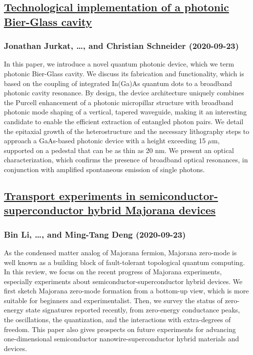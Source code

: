 \subsection*{\href{http://arxiv.org/abs/2009.10986v1}{Technological implementation of a photonic Bier-Glass cavity}}
\subsubsection*{Jonathan Jurkat, \dots, and Christian Schneider (2020-09-23)}
In this paper, we introduce a novel quantum photonic device, which we term
photonic Bier-Glass cavity. We discuss its fabrication and functionality, which
is based on the coupling of integrated In(Ga)As quantum dots to a broadband
photonic cavity resonance. By design, the device architecture uniquely combines
the Purcell enhancement of a photonic micropillar structure with broadband
photonic mode shaping of a vertical, tapered waveguide, making it an
interesting candidate to enable the efficient extraction of entangled photon
pairs. We detail the epitaxial growth of the heterostructure and the necessary
lithography steps to approach a GaAs-based photonic device with a height
exceeding 15 $\mu$m, supported on a pedestal that can be as thin as 20 nm. We
present an optical characterization, which confirms the presence of broadband
optical resonances, in conjunction with amplified spontaneous emission of
single photons.

\subsection*{\href{http://arxiv.org/abs/2009.10985v1}{Transport experiments in semiconductor-superconductor hybrid Majorana  devices}}
\subsubsection*{Bin Li, \dots, and Ming-Tang Deng (2020-09-23)}
As the condensed matter analog of Majorana fermion, Majorana zero-mode is
well known as a building block of fault-tolerant topological quantum computing.
In this review, we focus on the recent progress of Majorana experiments,
especially experiments about semiconductor-superconductor hybrid devices. We
first sketch Majorana zero-mode formation from a bottom-up view, which is more
suitable for beginners and experimentalist. Then, we survey the status of
zero-energy state signatures reported recently, from zero-energy conductance
peaks, the oscillations, the quantization, and the interactions with
extra-degrees of freedom. This paper also gives prospects on future experiments
for advancing one-dimensional semiconductor nanowire-superconductor hybrid
materials and devices.

